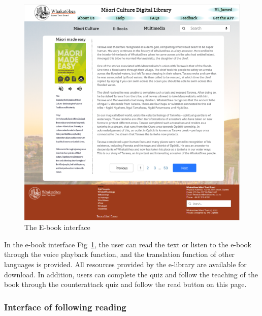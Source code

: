 \begin{figure}[htbp]
  \centerline{\includegraphics[width=400pt]{images/3-2-2.png}}
  \caption{The E-book interface}
  \label{fig3.2.2}
\end{figure}

In the e-book interface Fig~\ref{fig3.2.2}, the user can read the text or listen to the e-book through the voice playback function, and the translation function of other languages is provided. All resources provided by the e-library are available for download. In addition, users can complete the quiz and follow the teaching of the book through the counterattack quiz and follow the read button on this page.

\subsubsection{Interface of following reading }

